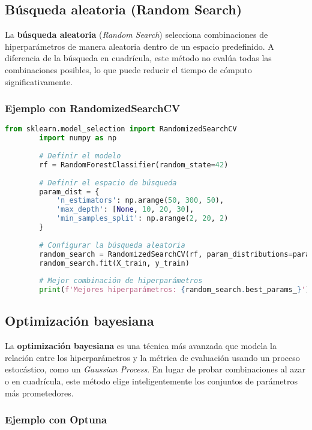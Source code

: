 \documentclass{book}
\begin{document}
	\subsection{Búsqueda aleatoria (Random Search)}
	
	La \textbf{búsqueda aleatoria} (\textit{Random Search}) selecciona combinaciones de hiperparámetros de manera aleatoria dentro de un espacio predefinido. A diferencia de la búsqueda en cuadrícula, este método no evalúa todas las combinaciones posibles, lo que puede reducir el tiempo de cómputo significativamente.
	
	\subsubsection{Ejemplo con RandomizedSearchCV}
	
	\begin{lstlisting}[language=Python, caption=Optimización de hiperparámetros con Random Search]
		from sklearn.model_selection import RandomizedSearchCV
		import numpy as np
		
		# Definir el modelo
		rf = RandomForestClassifier(random_state=42)
		
		# Definir el espacio de búsqueda
		param_dist = {
			'n_estimators': np.arange(50, 300, 50),
			'max_depth': [None, 10, 20, 30],
			'min_samples_split': np.arange(2, 20, 2)
		}
		
		# Configurar la búsqueda aleatoria
		random_search = RandomizedSearchCV(rf, param_distributions=param_dist, n_iter=10, cv=5, scoring='accuracy', random_state=42, n_jobs=-1)
		random_search.fit(X_train, y_train)
		
		# Mejor combinación de hiperparámetros
		print(f'Mejores hiperparámetros: {random_search.best_params_}')
	\end{lstlisting}
	
	\subsection{Optimización bayesiana}
	
	La \textbf{optimización bayesiana} es una técnica más avanzada que modela la relación entre los hiperparámetros y la métrica de evaluación usando un proceso estocástico, como un \textit{Gaussian Process}. En lugar de probar combinaciones al azar o en cuadrícula, este método elige inteligentemente los conjuntos de parámetros más prometedores.
	
	\subsubsection{Ejemplo con Optuna}
	
\end{document}
